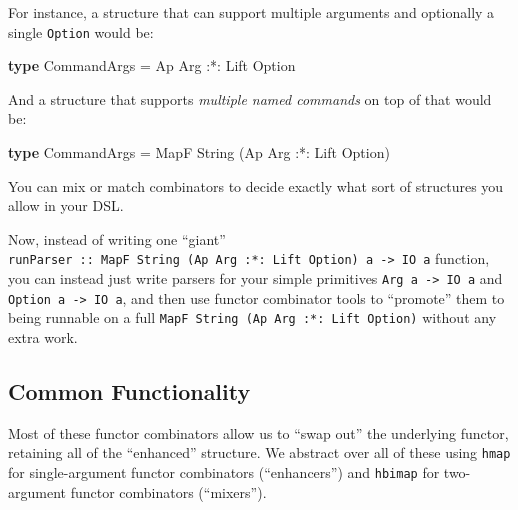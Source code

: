 \documentclass[]{article}
\newenvironment{Shaded}{}{}
\newcommand{\DataTypeTok}[1]{\textcolor[rgb]{0.56,0.13,0.00}{#1}}
\newcommand{\KeywordTok}[1]{\textcolor[rgb]{0.00,0.44,0.13}{\textbf{#1}}}
\newcommand{\NormalTok}[1]{#1}
\newcommand{\OperatorTok}[1]{\textcolor[rgb]{0.40,0.40,0.40}{#1}}
\newcommand{\OtherTok}[1]{\textcolor[rgb]{0.00,0.44,0.13}{#1}}
\begin{document}
For instance, a structure that can support multiple arguments and optionally a
single \texttt{Option} would be:

\begin{Shaded}
\begin{Highlighting}[]
\KeywordTok{type} \DataTypeTok{CommandArgs} \OtherTok{=} \DataTypeTok{Ap} \DataTypeTok{Arg} \OperatorTok{:*:} \DataTypeTok{Lift} \DataTypeTok{Option}
\end{Highlighting}
\end{Shaded}

And a structure that supports \emph{multiple named commands} on top of that
would be:

\begin{Shaded}
\begin{Highlighting}[]
\KeywordTok{type} \DataTypeTok{CommandArgs} \OtherTok{=} \DataTypeTok{MapF} \DataTypeTok{String}\NormalTok{ (}\DataTypeTok{Ap} \DataTypeTok{Arg} \OperatorTok{:*:} \DataTypeTok{Lift} \DataTypeTok{Option}\NormalTok{)}
\end{Highlighting}
\end{Shaded}

You can mix or match combinators to decide exactly what sort of structures you
allow in your DSL.

Now, instead of writing one ``giant''
\texttt{runParser\ ::\ MapF\ String\ (Ap\ Arg\ :*:\ Lift\ Option)\ a\ -\textgreater{}\ IO\ a}
function, you can instead just write parsers for your simple primitives
\texttt{Arg\ a\ -\textgreater{}\ IO\ a} and
\texttt{Option\ a\ -\textgreater{}\ IO\ a}, and then use functor combinator
tools to ``promote'' them to being runnable on a full
\texttt{MapF\ String\ (Ap\ Arg\ :*:\ Lift\ Option)} without any extra work.

\hypertarget{common-functionality}{%
\subsection{Common Functionality}\label{common-functionality}}

Most of these functor combinators allow us to ``swap out'' the underlying
functor, retaining all of the ``enhanced'' structure. We abstract over all of
these using \texttt{hmap} for single-argument functor combinators
(``enhancers'') and \texttt{hbimap} for two-argument functor combinators
(``mixers'').
\end{document}
